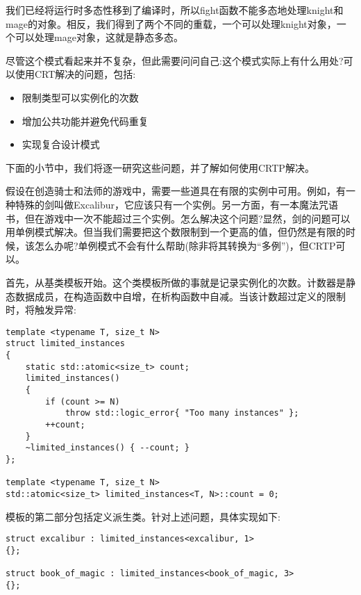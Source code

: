 我们已经将运行时多态性移到了编译时，所以fight函数不能多态地处理knight和mage的对象。相反，我们得到了两个不同的重载，一个可以处理knight对象，一个可以处理mage对象，这就是静态多态。

尽管这个模式看起来并不复杂，但此需要问问自己:这个模式实际上有什么用处?可以使用CRT解决的问题，包括:

\begin{itemize}
\item
限制类型可以实例化的次数

\item
增加公共功能并避免代码重复

\item
实现复合设计模式
\end{itemize}

下面的小节中，我们将逐一研究这些问题，并了解如何使用CRTP解决。


假设在创造骑士和法师的游戏中，需要一些道具在有限的实例中可用。例如，有一种特殊的剑叫做Excalibur，它应该只有一个实例。另一方面，有一本魔法咒语书，但在游戏中一次不能超过三个实例。怎么解决这个问题?显然，剑的问题可以用单例模式解决。但当我们需要把这个数限制到一个更高的值，但仍然是有限的时候，该怎么办呢?单例模式不会有什么帮助(除非将其转换为“多例”)，但CRTP可以。

首先，从基类模板开始。这个类模板所做的事就是记录实例化的次数。计数器是静态数据成员，在构造函数中自增，在析构函数中自减。当该计数超过定义的限制时，将触发异常:

\begin{lstlisting}[style=styleCXX]
template <typename T, size_t N>
struct limited_instances
{
	static std::atomic<size_t> count;
	limited_instances()
	{
		if (count >= N)
			throw std::logic_error{ "Too many instances" };
		++count;
	}
	~limited_instances() { --count; }
};

template <typename T, size_t N>
std::atomic<size_t> limited_instances<T, N>::count = 0;
\end{lstlisting}

模板的第二部分包括定义派生类。针对上述问题，具体实现如下:

\begin{lstlisting}[style=styleCXX]
struct excalibur : limited_instances<excalibur, 1>
{};

struct book_of_magic : limited_instances<book_of_magic, 3>
{};
\end{lstlisting}

